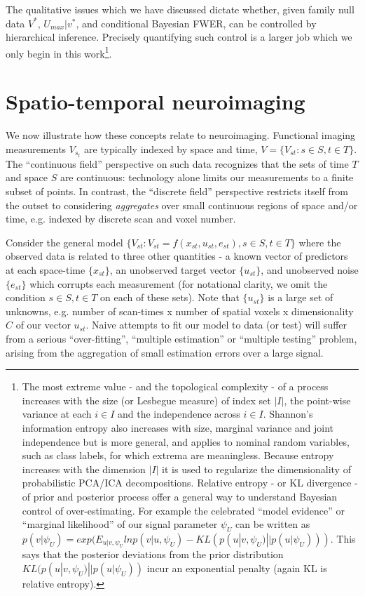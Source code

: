 \documentclass{article}
\begin{document}
The qualitative issues which we have discussed dictate whether, given family null data $V^*$, $U_{max}|v^*$, and conditional Bayesian FWER, can be controlled by hierarchical inference. Precisely quantifying such control is a larger job which we only begin in this work\footnote{The most extreme value - and the topological complexity - of a process increases with the size (or Lesbegue measure) of index set $|I|$, the point-wise variance at each $i \in I$ and the independence across $i\in I$. Shannon's information entropy also increases with size, marginal variance and joint independence but is more general, and applies to nominal random variables, such as class labels, for which extrema are meaningless. Because entropy increases with the dimension $|I|$ it is used to regularize the dimensionality of probabilistic PCA/ICA decompositions. Relative entropy - or KL divergence - of prior and posterior process offer a general way to understand Bayesian control of over-estimating. For example the celebrated ``model evidence'' or ``marginal likelihood'' of our signal parameter $\psi_U$ can be written as $p(v|\psi_U) = exp(E_{u | v, \psi_U}ln p(v| u, \psi_U) - KL(p(u|v,\psi_U) || p(u|\psi_U)))$. This says that the posterior deviations from the prior distribution $KL(p(u|v,\psi_U) || p(u|\psi_U))$ incur an exponential penalty (again KL is relative entropy).}.

\section{Spatio-temporal neuroimaging}

We now illustrate how these concepts relate to neuroimaging. Functional imaging measurements $V_s_t$ are typically indexed by space and time, $V = \{V_{st} :s \in S, t \in T\}$. The ``continuous field'' perspective on such data recognizes that the sets of time $T$ and space $S$ are continuous: technology alone limits our measurements to a finite subset of points. In contrast, the ``discrete field'' perspective restricts itself from the outset to considering \textit{aggregates} over small continuous regions of space and/or time, e.g. indexed by discrete scan and voxel number.

Consider the general model $\{V_{st} : V_{st} = f(x_{st},u_{st}, e_{st}), s \in S, t \in T\}$ where the observed data is related to three other quantities - a known vector of predictors at each space-time $\{x_{st}\}$, an unobserved target vector $\{u_{st} \}$, and unobserved noise $\{e_{st}\}$ which corrupts each measurement (for notational clarity, we omit the condition $s \in S, t \in T$ on each of these sets). Note that $\{u_{st}\}$ is a large set of unknowns, e.g. number of scan-times x number of spatial voxels x dimensionality $C$ of our vector $u_{st}$. Naive attempts to fit our model to data (or test) will suffer from a serious ``over-fitting'', ``multiple estimation'' or ``multiple testing'' problem, arising from the aggregation of small estimation errors over a large signal.
\end{document}
